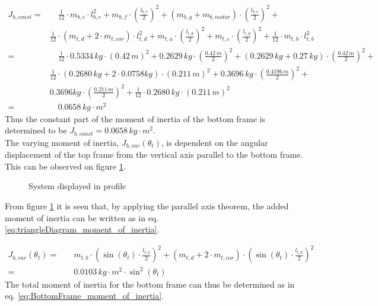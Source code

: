 \documentclass[../../main]{subfiles}
\begin{document}
\begin{equation}
  \label{eq:J_b,const}
  \begin{split}
      J_{b,const} =& \quad \frac{1}{12}\cdot m_{b,e}\cdot l_{b,e}^2 + m_{b,f} \cdot \left( \frac{l_{b,e}}{2} \right)^2 + (m_{b,g}+m_{b,motor}) \cdot \left(\frac{l_{b,e}}{2}\right)^2 +\\
      & \frac{1}{12}\cdot (m_{t,d}+2\cdot m_{t,cor})\cdot l_{t,d}^2 + m_{t,a}\cdot \left(\frac{l_{t,d}}{2}\right)^2 + m_{t,c}\cdot \left(\frac{l_{t,d}}{2}\right)^2 + \frac{1}{12}\cdot m_{t,b} \cdot l_{t,b}^2\\
      =& \quad \frac{1}{12} \cdot 0.5334\si{\,kg} \cdot (0.42\si{\,m})^2 + 0.2629\si{\,kg} \cdot \left( \frac{0.42\si{\,m}}{2} \right)^2 + (0.2629\si{\,kg}+0.27\si{\,kg}) \cdot \left( \frac{0.42\si{\,m}}{2} \right)^2 +\\
      & \frac{1}{12}\cdot (0.2680\si{\,kg}+2\cdot 0.0758\si{kg})\cdot (0.211\si{\,m})^2 + 0.3696\si{\,kg}\cdot \left(\frac{0.4196\si{\,m}}{2}\right)^2 +\\
      &0.3696\si{kg}\cdot \left(\frac{0.211\si{\,m}}{2}\right)^2 + \frac{1}{12}\cdot 0.2680\si{\,kg} \cdot (0.211\si{\,m})^2\\
      =& \quad 0.0658\si{\,kg\cdot m^2}
  \end{split}
\end{equation}
Thus the constant part of the moment of inertia of the bottom frame is determined to be $J_{b,const} = 0.0658\si{\,kg\cdot m^2}$.\\
The varying moment of inertia, $J_{b,var}(\theta_t)$, is dependent on the angular displacement of the top frame from the vertical axis parallel to the bottom frame. This can be observed on figure \ref{fig:TrekantDiagram}.

\begin{figure}[H]
  \centering
  \def\svgwidth{0.4\columnwidth}
  
  \caption{System displayed in profile}
  \label{fig:TrekantDiagram}
\end{figure}

From figure \ref{fig:TrekantDiagram} it is seen that, by applying the parallel axis theorem, the added moment of inertia can be written as in eq. \eqref{eq:triangleDiagram_moment_of_inertia}.

\begin{equation}
  \label{eq:triangleDiagram_moment_of_inertia}
  \begin{split}
  J_{b,var}(\theta_t) =& \quad m_{t,b} \cdot \left( \sin(\theta_t) \cdot \frac{l_{t,a}}{2} \right)^2 + (m_{t,d} + 2\cdot m_{t,cor}) \cdot \left( \sin(\theta_t) \cdot \frac{l_{t,d}}{2}\right)^2\\
  =& \quad 0.0103 \si{\,kg\cdot m^2}\cdot \sin^2(\theta_t)
  \end{split}
\end{equation}
The total moment of inertia for the bottom frame can thus be determined as in eq. \eqref{eq:BottomFrame_moment_of_inertia}.
\end{document}
